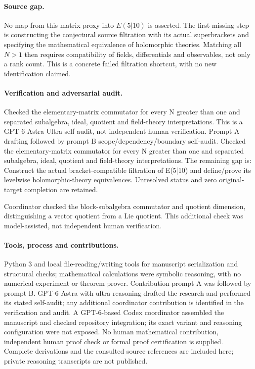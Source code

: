 \documentclass[11pt]{article}
\begin{document}
\paragraph{Source gap.} No map from this matrix proxy into \(E(5|10)\) is asserted. The first missing step is constructing the conjectural source filtration with its actual superbrackets and specifying the mathematical equivalence of holomorphic theories. Matching all \(N>1\) then requires compatibility of fields, differentials and observables, not only a rank count. This is a concrete failed filtration shortcut, with no new identification claimed.

\paragraph{Verification and adversarial audit.}
Checked the elementary-matrix commutator for every N greater than one and separated subalgebra, ideal, quotient and field-theory interpretations. This is a GPT-6 Astra Ultra self-audit, not independent human verification. Prompt A drafting followed by prompt B scope/dependency/boundary self-audit. Checked the elementary-matrix commutator for every N greater than one and separated subalgebra, ideal, quotient and field-theory interpretations. The remaining gap is: Construct the actual bracket-compatible filtration of E(5|10) and define/prove its levelwise holomorphic-theory equivalences. Unresolved status and zero original-target completion are retained.

Coordinator checked the block-subalgebra commutator and quotient dimension, distinguishing a vector quotient from a Lie quotient. This additional check was model-assisted, not independent human verification.

\paragraph{Tools, process and contributions.}
Python 3 and local file-reading/writing tools for manuscript serialization and structural checks; mathematical calculations were symbolic reasoning, with no numerical experiment or theorem prover. Contribution prompt A was followed by prompt B. GPT-6 Astra with ultra reasoning drafted the research and performed its stated self-audit; any additional coordinator contribution is identified in the verification and audit. A GPT-6-based Codex coordinator assembled the manuscript and checked repository integration; its exact variant and reasoning configuration were not exposed. No human mathematical contribution, independent human proof check or formal proof certification is supplied. Complete derivations and the consulted source references are included here; private reasoning transcripts are not published.
\end{document}

